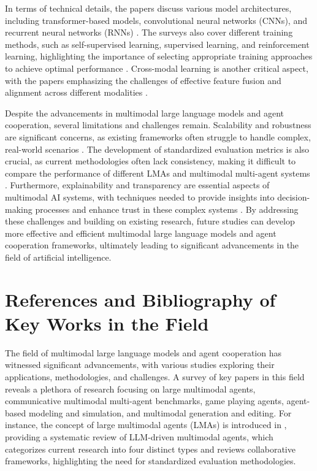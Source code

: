 \documentclass[conference]{IEEEtran}
\begin{document}
In terms of technical details, the papers discuss various model architectures, including transformer-based models, convolutional neural networks (CNNs), and recurrent neural networks (RNNs) \cite{b11}. The surveys also cover different training methods, such as self-supervised learning, supervised learning, and reinforcement learning, highlighting the importance of selecting appropriate training approaches to achieve optimal performance \cite{b12}. Cross-modal learning is another critical aspect, with the papers emphasizing the challenges of effective feature fusion and alignment across different modalities \cite{b13}.

Despite the advancements in multimodal large language models and agent cooperation, several limitations and challenges remain. Scalability and robustness are significant concerns, as existing frameworks often struggle to handle complex, real-world scenarios \cite{b14}. The development of standardized evaluation metrics is also crucial, as current methodologies often lack consistency, making it difficult to compare the performance of different LMAs and multimodal multi-agent systems \cite{b15}. Furthermore, explainability and transparency are essential aspects of multimodal AI systems, with techniques needed to provide insights into decision-making processes and enhance trust in these complex systems \cite{b16}. By addressing these challenges and building on existing research, future studies can develop more effective and efficient multimodal large language models and agent cooperation frameworks, ultimately leading to significant advancements in the field of artificial intelligence.

\section{References and Bibliography of Key Works in the Field}
The field of multimodal large language models and agent cooperation has witnessed significant advancements, with various studies exploring their applications, methodologies, and challenges. A survey of key papers in this field reveals a plethora of research focusing on large multimodal agents, communicative multimodal multi-agent benchmarks, game playing agents, agent-based modeling and simulation, and multimodal generation and editing. For instance, the concept of large multimodal agents (LMAs) is introduced in \cite{b1}, providing a systematic review of LLM-driven multimodal agents, which categorizes current research into four distinct types and reviews collaborative frameworks, highlighting the need for standardized evaluation methodologies.
\end{document}
